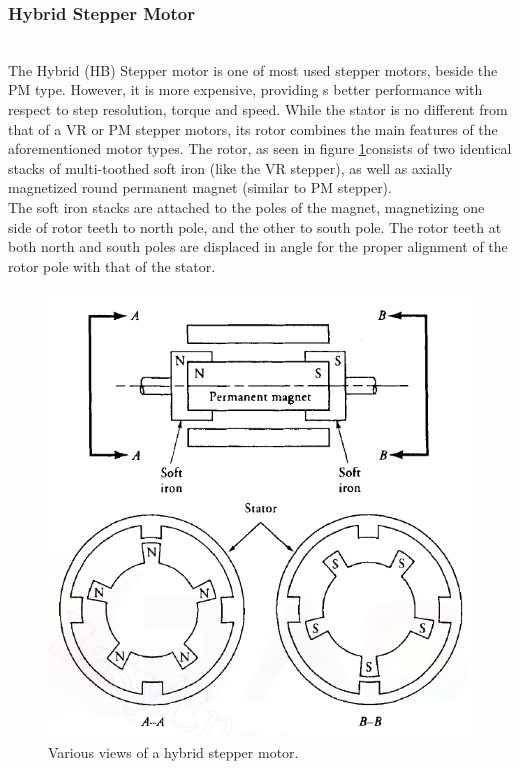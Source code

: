 \documentclass[journal]{IEEEtran}
\begin{document}
\subsubsection{Hybrid Stepper Motor}\hfill\\
The Hybrid (HB) Stepper motor is one of most used stepper motors, beside the PM type. However, it is more expensive, providing s better performance with respect to step resolution, torque and speed. While the stator is no different from that of a VR or PM stepper motors, its rotor combines the main features of the aforementioned motor types. The rotor, as seen in figure \ref{hbS}consists of two identical stacks of multi-toothed soft iron (like the VR stepper), as well as axially magnetized round permanent magnet (similar to PM stepper). \\The soft iron stacks are attached to the poles of the magnet, magnetizing one side of rotor teeth to north pole, and the other to south pole. The rotor teeth at both north and south poles are displaced in angle for the proper alignment of the rotor pole with that of the stator. \cite{guru2007} \cite{stepperNotes} 
\begin{figure}[h]
    \centering
    \includegraphics[scale=0.5]{Stepper/hbStep.png}
    \caption{Various views of a hybrid stepper motor.}
    \label{hbS}
\end{figure}
\end{document}
